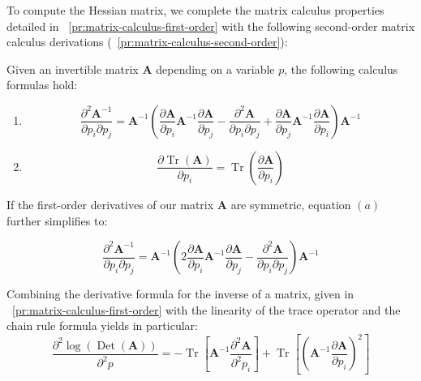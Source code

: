 \documentclass[long, final]{jobim}
\DeclareMathOperator*{\Tr}{Tr}
\DeclareMathOperator*{\DET}{Det}
\begin{document}
To compute the Hessian matrix, we complete the matrix calculus properties detailed in \propertyname~\ref{pr:matrix-calculus-first-order} with the following second-order matrix calculus derivations (\propertyname~\ref{pr:matrix-calculus-second-order}):

\begin{property}
\label{pr:matrix-calculus-second-order}
Given an invertible matrix $\boldsymbol{A}$ depending on a variable $p$, the following calculus formulas hold:
\begin{multicols}{2}
\begin{enumerate}[label=(\alph*)]
\item 
$$ \frac{\partial^2 \boldsymbol{A}^{-1}}{\partial p_i \partial p_j} =  \boldsymbol{A}^{-1} \left( \frac{\partial \boldsymbol{A}}{\partial p_i } \boldsymbol{A}^{-1} \frac{\partial \boldsymbol{A}}{\partial p_j} - \frac{\partial^2 \boldsymbol{A}}{\partial p_i \partial p_j}  + \frac{\partial \boldsymbol{A}}{\partial p_j } \boldsymbol{A}^{-1} \frac{\partial \boldsymbol{A}}{\partial p_i}\right) \boldsymbol{A}^{-1}
$$
\item 
$$
\frac{\partial \Tr \left(\boldsymbol{A}\right)}{\partial p_i} = \Tr  \left(\frac{\partial \boldsymbol{A}}{\partial p_i}\right)
$$


\end{enumerate}
\end{multicols}

If the first-order derivatives of our matrix $\boldsymbol{A}$ are symmetric, equation $(a)$ further simplifies to:

\begin{equation*}
    \frac{\partial^2 \boldsymbol{A}^{-1}}{\partial p_i \partial p_j} =  \boldsymbol{A}^{-1} \left( 2 \frac{\partial \boldsymbol{A}}{\partial p_i } \boldsymbol{A}^{-1} \frac{\partial \boldsymbol{A}}{\partial p_j} - \frac{\partial^2 \boldsymbol{A}}{\partial p_i \partial p_j} \right) \boldsymbol{A}^{-1}
\end{equation*}

Combining the derivative formula for the inverse of a matrix, given in \propertyname~\ref{pr:matrix-calculus-first-order} with the linearity of the trace operator and the chain rule formula yields in particular:
\begin{equation*}
    \frac{\partial^2 \log \left(\DET (\boldsymbol{A})\right)}{\partial^2 p} = - \Tr  \left[\boldsymbol{A}^{-1}\frac{\partial^2 \boldsymbol{A}}{\partial^2 p_i}\right] +
\Tr  \left[\left(\boldsymbol{A}^{-1}\frac{\partial \boldsymbol{A}}{\partial p_i}\right)^2\right]
\end{equation*}



\end{property}
\end{document}
